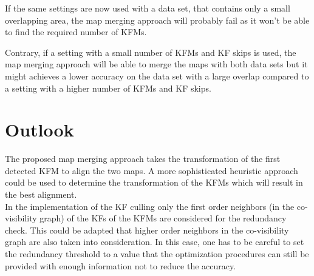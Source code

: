 If the same settings are now used with a data set, that contains only a small overlapping area, the map merging approach will probably fail as it won't be able to find the required number of \acp{KFM}.

Contrary, if a setting with a small number of \acp{KFM} and \ac{KF} skips is used, the map merging approach will be able to merge the maps with both data sets but it might achieves a lower accuracy on the data set with a large overlap compared to a setting with a higher number of \acp{KFM} and \ac{KF} skips.

\section{Outlook}

The proposed map merging approach takes the transformation of the first detected \ac{KFM} to align the two maps. A more sophisticated heuristic approach could be used to determine the transformation of the \acp{KFM} which will result in the best alignment.\\

In the implementation of the \ac{KF} culling only the first order neighbors (in the co-visibility graph) of the \acp{KF} of the \acp{KFM} are considered for the redundancy check. This could be adapted that higher order neighbors in the co-visibility graph are also taken into consideration. In this case, one has to be careful to set the redundancy threshold to a value that the optimization procedures can still be provided with enough information not to reduce the accuracy.
